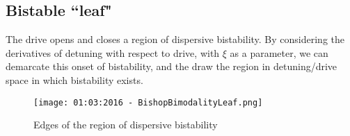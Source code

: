 \subsection{Bistable ``leaf"}
The drive opens and closes a region of dispersive bistability. By considering the derivatives of detuning with respect to drive, with $\xi$ as a parameter, we can demarcate this onset of bistability, and the draw the region in detuning/drive space in which bistability exists.
\begin{figure}[ht]
        \label{BistabilityLeaf}
        \texttt{[image: 01:03:2016 - BishopBimodalityLeaf.png]}
        \caption{Edges of the region of dispersive bistability}
\end{figure}
